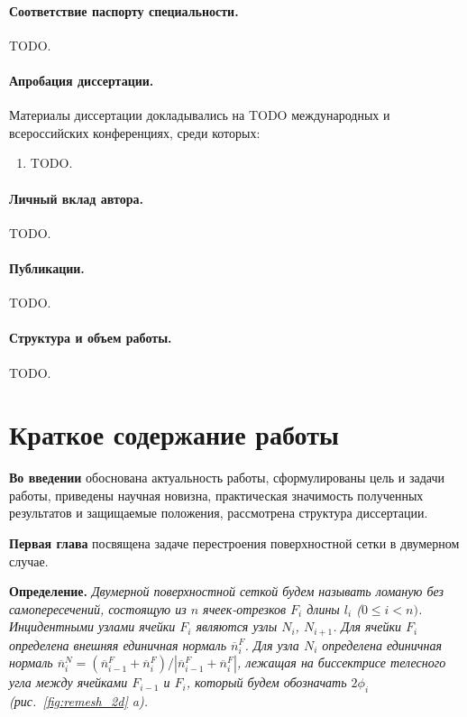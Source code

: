 \documentclass[a4paper,14pt]{extarticle}                     %
\theoremstyle{plain}                                         %
\begin{document}
\paragraph{Соответствие паспорту специальности.} TODO.

\paragraph{Апробация диссертации.}
Материалы диссертации докладывались на TODO международных и всероссийских конференциях, среди которых:
\begin{enumerate}
\item TODO.
\end{enumerate}

\paragraph{Личный вклад автора.} TODO.

\paragraph{Публикации.} TODO.

\paragraph{Структура и объем работы.} TODO.


\newpage
\section*{Краткое содержание работы}

\textbf{Во введении} обоснована актуальность работы, сформулированы цель и задачи работы, приведены научная новизна, практическая значимость полученных результатов и защищаемые положения, рассмотрена структура диссертации. 


\textbf{Первая глава} посвящена задаче перестроения поверхностной сетки в двумерном случае.

\textbf{Определение.} \textit{Двумерной поверхностной сеткой будем называть ломаную без самопересечений, состоящую из $n$ ячеек-отрезков $F_i$ длины $l_i$ ($0 \le i < n)$. Инцидентными узлами ячейки $F_i$ являются узлы $N_i$, $N_{i + 1}$. Для ячейки $F_i$ определена внешняя единичная нормаль $\overline{n}_i^F$. Для узла $N_i$ определена единичная нормаль $\overline{n}_i^N = (\overline{n}_{i-1}^F + \overline{n}_i^F) / |\overline{n}_{i-1}^F + \overline{n}_i^F|$, лежащая на биссектрисе телесного угла между ячейками $F_{i - 1}$ и $F_i$, который будем обозначать $2 \phi_i$ (рис.~\ref{fig:remesh_2d} a).}
\end{document}
